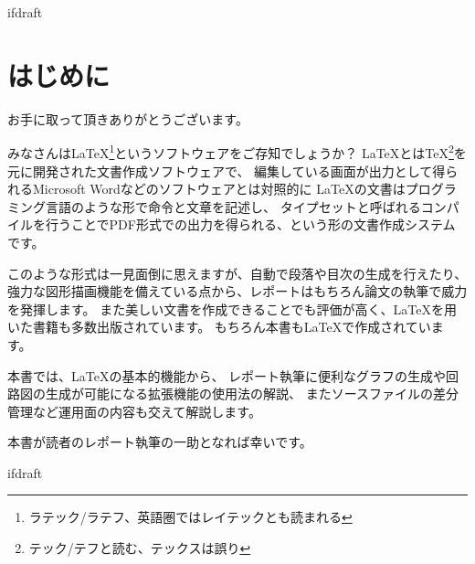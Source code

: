 \expandafter\ifx\csname ifdraft\endcsname\relax
    

\fi

\chapter{はじめに}
	お手に取って頂きありがとうございます。

	みなさんは\LaTeX \footnote{ラテック/ラテフ、英語圏ではレイテックとも読まれる}というソフトウェアをご存知でしょうか？
	\LaTeX とは\TeX \footnote{テック/テフと読む、テックスは誤り}を元に開発された文書作成ソフトウェアで、
	編集している画面が出力として得られるMicrosoft Wordなどのソフトウェアとは対照的に
	\LaTeX の文書はプログラミング言語のような形で命令と文章を記述し、
	タイプセットと呼ばれるコンパイルを行うことでPDF形式での出力を得られる、という形の文書作成システムです。

	このような形式は一見面倒に思えますが、自動で段落や目次の生成を行えたり、
	強力な図形描画機能を備えている点から、レポートはもちろん論文の執筆で威力を発揮します。
	また美しい文書を作成できることでも評価が高く、\LaTeX を用いた書籍も多数出版されています。
	もちろん本書も\LaTeX で作成されています。

	本書では、\LaTeX の基本的機能から、
	レポート執筆に便利なグラフの生成や回路図の生成が可能になる拡張機能の使用法の解説、
	またソースファイルの差分管理など運用面の内容も交えて解説します。

	本書が読者のレポート執筆の一助となれば幸いです。


\expandafter\ifx\csname ifdraft\endcsname\relax
	
\fi